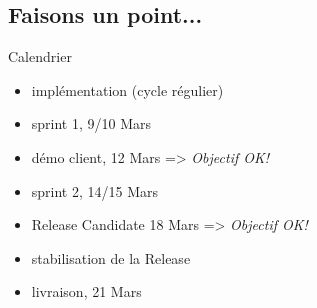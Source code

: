 \subsection{Faisons un point...}

\begin{frame}{Calendrier}
  \begin{itemize}
    \item implémentation (cycle régulier) 
    \item sprint 1, 9/10 Mars
    \item démo client, 12 Mars => \emph{Objectif OK!}
    \item sprint 2, 14/15 Mars
    \item Release Candidate 18 Mars => \emph{Objectif OK!}
    \item stabilisation de la Release
    \item livraison, 21 Mars
  \end{itemize}
\end{frame}


